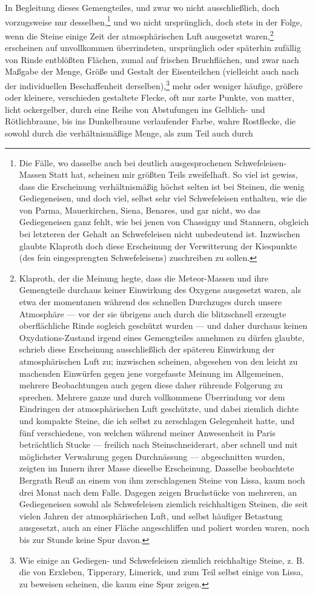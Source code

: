 \documentclass[a4paper, 11pt, oneside, german]{article}
\begin{document}
In Begleitung dieses Gemengteiles, und zwar wo nicht ausschließlich, doch vorzugsweise nur desselben,\footnote{Die Fälle, wo dasselbe auch bei deutlich ausgesprochenen Schwefeleisen-Massen Statt hat, scheinen mir größten Teils zweifelhaft. So viel ist gewiss, dass die Erscheinung verhältnismäßig höchst selten ist bei Steinen, die wenig Gediegeneisen, und doch viel, selbst sehr viel Schwefeleisen enthalten, wie die von Parma, Mauerkirchen, Siena, Benares, und gar nicht, wo das Gediegeneisen ganz fehlt, wie bei jenen von Chassigny und Stannern, obgleich bei letzteren der Gehalt an Schwefeleisen nicht unbedeutend ist. Inzwischen glaubte Klaproth doch diese Erscheinung der Verwitterung der Kiespunkte (des fein eingesprengten Schwefeleisens) zuschreiben zu sollen.} und wo nicht ursprünglich, doch stets in der Folge, wenn die Steine einige Zeit der atmosphärischen Luft ausgesetzt waren,\footnote{Klaproth, der die Meinung hegte, dass die Meteor-Massen und ihre Gemengteile durchaus keiner Einwirkung des Oxygens ausgesetzt waren, als etwa der momentanen während des schnellen Durchzuges durch unsere Atmosphäre --- vor der sie übrigens auch durch die blitzschnell erzeugte oberflächliche Rinde sogleich geschützt wurden --- und daher durchaus keinen Oxydations-Zustand irgend eines Gemengteiles annehmen zu dürfen glaubte, schrieb diese Erscheinung ausschließlich der späteren Einwirkung der atmosphärischen Luft zu; inzwischen scheinen, abgesehen von den leicht zu machenden Einwürfen gegen jene vorgefasste Meinung im Allgemeinen, mehrere Beobachtungen auch gegen diese daher rührende Folgerung zu sprechen. Mehrere ganze und durch vollkommene Überrindung vor dem Eindringen der atmosphärischen Luft geschützte, und dabei ziemlich dichte und kompakte Steine, die ich selbst zu zerschlagen Gelegenheit hatte, und fünf verschiedene, von welchen während meiner Anwesenheit in Paris beträchtlich Stucke --- freilich nach Steinschneiderart, aber schnell und mit möglichster Verwahrung gegen Durchnässung --- abgeschnitten wurden, zeigten im Innern ihrer Masse dieselbe Erscheinung. Dasselbe beobachtete Bergrath Reuß an einem von ihm zerschlagenen Steine von Lissa, kaum noch drei Monat nach dem Falle. Dagegen zeigen Bruchstücke von mehreren, an Gediegeneisen sowohl als Schwefeleisen ziemlich reichhaltigen Steinen, die seit vielen Jahren der atmosphärischen Luft, und selbst häufiger Betastung ausgesetzt, auch an einer Fläche angeschliffen und poliert worden waren, noch bis zur Stunde keine Spur davon.} erscheinen auf unvollkommen überrindeten, ursprünglich oder späterhin zufällig von Rinde entblößten Flächen, zumal auf frischen Bruchflächen, und zwar nach Maßgabe der Menge, Größe und Gestalt der Eisenteilchen (vielleicht auch nach der individuellen Beschaffenheit derselben),\footnote{Wie einige an Gediegen- und Schwefeleisen ziemlich reichhaltige Steine, z. B. die von Erxleben, Tipperary, Limerick, und zum Teil selbst einige von Lissa, zu beweisen scheinen, die kaum eine Spur zeigen.} mehr oder weniger häufige, größere oder kleinere, verschieden gestaltete Flecke, oft nur zarte Punkte, von matter, licht ockergelber, durch eine Reihe von Abstufungen ins Gelblich- und Rötlichbraune, bis ins Dunkelbraune verlaufender Farbe, wahre Rostflecke, die sowohl durch die verhältnismäßige Menge, als zum Teil auch durch 
\end{document}
